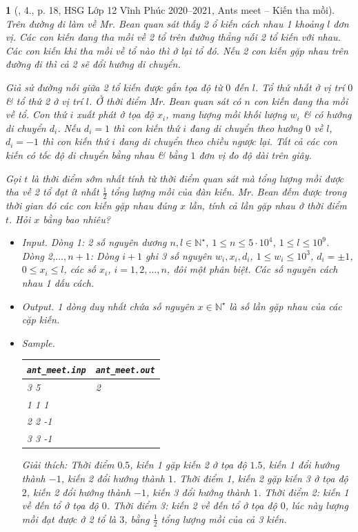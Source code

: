 \documentclass{article}
\newtheorem{baitoan}{}
\begin{document}
\begin{baitoan}[\cite{Trung_HSG_THPT_Tin}, 4., p. 18, HSG Lớp 12 Vĩnh Phúc 2020--2021, Ants meet -- Kiến tha mồi]
	Trên đường đi làm về Mr. Bean quan sát thấy 2 ổ kiến cách nhau 1 khoảng $l$ đơn vị. Các con kiến đang tha mồi về 2 tổ trên đường thẳng nối 2 tổ kiến với nhau. Các con kiến khi tha mồi về tổ nào thì ở lại tổ đó. Nếu 2 con kiến gặp nhau trên đường đi thì cả 2 sẽ đổi hướng di chuyển.
	
	Giả sử đường nối giữa 2 tổ kiến được gắn tọa độ từ $0$ đến $l$. Tổ thứ nhất ở vị trí $0$ \& tổ thứ 2 ở vị trí $l$. Ở thời điểm Mr. Bean quan sát có $n$ con kiến đang tha mồi về tổ. Con thứ $i$ xuất phát ở tọa độ $x_i$, mang lượng mồi khối lượng $w_i$ \& có hướng di chuyển $d_i$. Nếu $d_i = 1$ thì con kiến thứ $i$ đang di chuyển theo hướng $0$ về $l$, $d_i = -1$ thì con kiến thứ $i$ đang di chuyển theo chiều ngược lại. Tất cả các con kiến có tốc độ di chuyển bằng nhau \& bằng $1$ đơn vị đo độ dài trên giây.
	
	Gọi $t$ là thời điểm sớm nhất tính từ thời điểm quan sát mà tổng lượng mồi được tha về 2 tổ đạt ít nhất $\frac{1}{2}$ tổng lượng mồi của đàn kiến. Mr. Bean đếm được trong thời gian đó các con kiến gặp nhau đúng $x$ lần, tính cả lần gặp nhau ở thời điểm $t$. Hỏi $x$ bằng bao nhiêu?
	\begin{itemize}
		\item {\sf Input.} Dòng 1: 2 số nguyên dương $n,l\in\mathbb{N}^\star$, $1\le n\le5\cdot10^4$, $1\le l\le10^9$. Dòng 2,$\ldots,n + 1$: Dòng $i + 1$ ghi 3 số nguyên $w_i,x_i,d_i$, $1\le w_i\le10^3$, $d_i = \pm1$, $0\le x_i\le l$, các số $x_i$, $i = 1,2,\ldots,n$, đôi một phân biệt. Các số nguyên cách nhau 1 dấu cách.
		\item {\sf Output.} 1 dòng duy nhất chứa số nguyên $x\in\mathbb{N}^\star$ là số lần gặp nhau của các cặp kiến.
		\item {\sf Sample.}
		\begin{table}[H]
			\centering
			\begin{tabular}{|l|l|}
				\hline
				\verb|ant_meet.inp| & \verb|ant_meet.out| \\
				\hline
				3 5 & 2 \\
				1 1 1 & \\
				2 2 -1 & \\
				3 3 -1 & \\
				\hline
			\end{tabular}
		\end{table}
		Giải thích: Thời điểm $0.5$, kiến 1 gặp kiến 2 ở tọa độ $1.5$, kiến 1 đổi hướng thành $-1$, kiến 2 đổi hướng thành $1$. Thời điểm 1, kiến 2 gặp kiến 3 ở tọa độ $2$, kiến 2 đổi hướng thành $-1$, kiến 3 đổi hướng thành $1$. Thời điểm 2: kiến 1 về đến tổ ở tọa độ $0$. Thời điểm 3: kiến 2 về đến tổ ở tọa độ $0$, lúc này lượng mồi đạt được ở 2 tổ là $3$, bằng  $\frac{1}{2}$ tổng lượng mồi của cả 3 kiến.
	\end{itemize}
\end{baitoan}
\end{document}
